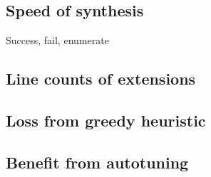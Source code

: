 \subsection{Speed of synthesis}
Success, fail, enumerate
\subsection{Line counts of extensions}
\subsection{Loss from greedy heuristic}
\subsection{Benefit from autotuning}


%
%
%
%
%
%
%
